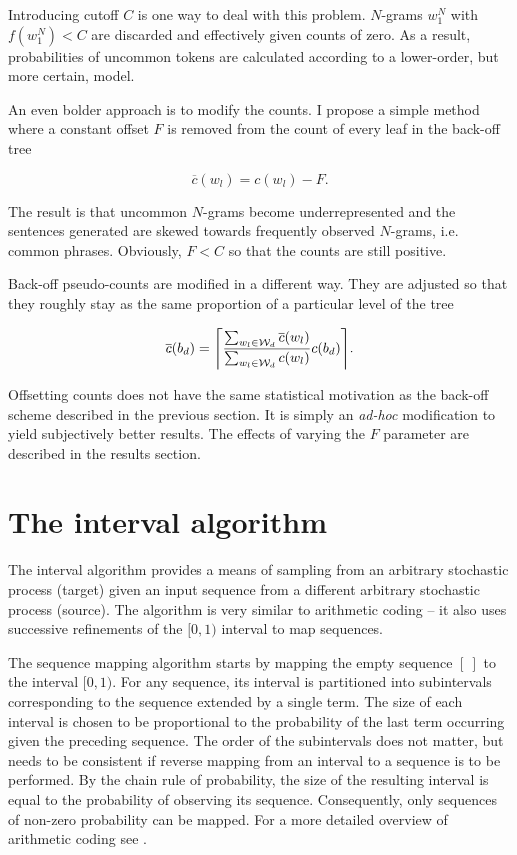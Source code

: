 \documentclass[draft]{IIBproject}
\makeatletter
\DeclarePairedDelimiter{\ceil}{\lceil}{\rceil}
\DeclareRobustCommand*{\ie}{i.e.\@\xspace}
\makeatother
\begin{document}
Introducing cutoff $C$ is one way to deal with this problem. $N$-grams $w_1^N$ with $f(w_1^N) < C$ are discarded and effectively given counts of zero. As a result, probabilities of uncommon tokens are calculated according to a lower-order, but more certain, model.

An even bolder approach is to modify the counts. I propose a simple method where a constant offset $F$ is removed from the count of every leaf in the back-off tree

\begin{equation}
\label{eq:offsetting_leaves}
\overline c(w_l) = c(w_l) - F .
\end{equation}

The result is that uncommon $N$-grams become underrepresented and the sentences generated are skewed towards frequently observed $N$-grams, \ie common phrases. Obviously, $F<C$ so that the counts are still positive.

Back-off pseudo-counts are modified in a different way. They are adjusted so that they roughly stay as the same proportion of a particular level of the tree

\begin{equation}
\label{eq:adjusting_backoff_pseudocounts}
\overline c(b_d) = \ceil*{ \frac {\sum_{w_l \in \mathcal W_d} \overline c(w_l)} {\sum_{w_l \in \mathcal W_d} c(w_l)} c(b_d) }.
\end{equation}

Offsetting counts does not have the same statistical motivation as the back-off scheme described in the previous section. It is simply an \emph{ad-hoc} modification to yield subjectively better results. The effects of varying the $F$ parameter are described in the results section.

\cleardoublepage
\section{The interval algorithm}
\label{sec:interval_algorithm}

The interval algorithm \cite{hanhoshi1997} provides a means of sampling from an arbitrary stochastic process (target) given an input sequence from a different arbitrary stochastic process (source). The algorithm is very similar to arithmetic coding -- it also uses successive refinements of the $[0,1)$ interval to map sequences.

The sequence mapping algorithm starts by mapping the empty sequence $[~]$ to the interval $[0,1)$. For any sequence, its interval is partitioned into subintervals corresponding to the sequence extended by a single term. The size of each interval is chosen to be proportional to the probability of the last term occurring given the preceding sequence. The order of the subintervals does not matter, but needs to be consistent if reverse mapping from an interval to a sequence is to be performed. By the chain rule of probability, the size of the resulting interval is equal to the probability of observing its sequence. Consequently, only sequences of non-zero probability can be mapped. For a more detailed overview of arithmetic coding see \cite{coverthomas:sfecoding,said2004introduction}.
\end{document}
